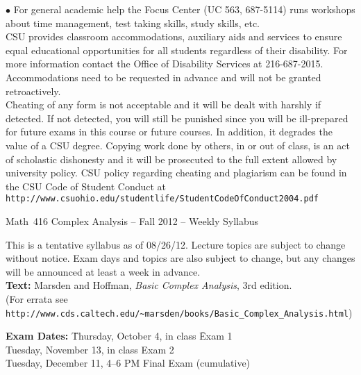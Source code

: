 \documentclass[11pt]{article}
\begin{document}
$\bullet$ For general academic help the Focus Center (UC 563,
687-5114) runs workshops about time management, test taking skills,
study skills, etc. \\

 CSU provides 
classroom accommodations, auxiliary aids and services to ensure equal educational
opportunities for all students regardless of their disability. For more information contact
the Office of Disability Services at 216-687-2015. Accommodations need to be
requested in advance and will not be granted retroactively.\\

 Cheating of any form is not
acceptable and it will be dealt with harshly if detected. If not
detected, you will still be punished since you will be ill-prepared
for future exams in this course or future courses. In addition, it
degrades the value of a CSU degree.
Copying work done by others, in or out of class, is an act of
scholastic dishonesty and it will be prosecuted to the full extent
allowed by university policy. 
CSU policy regarding cheating and plagiarism can be found in the CSU
Code of Student Conduct at
{\tt http://www.csuohio.edu/studentlife/StudentCodeOfConduct2004.pdf}

\newpage
\setlength{\topmargin}{0in}
\setlength{\oddsidemargin}{0in}
\setlength{\textwidth}{6.5in}
\setlength{\textheight}{9.2in}
\setlength{\parindent}{0in}
\pagestyle{empty}

\begin{center}
\begin{bf}
\noindent
{\large Math~416 Complex Analysis -- Fall 2012 -- Weekly Syllabus}\\
\end{bf}
\end{center}

This is a tentative syllabus as of 08/26/12. Lecture topics are subject
to change without notice. Exam days and topics 
are also subject to change, but any changes will be
announced at least a week in advance.\\
  
{\bf Text:} Marsden and Hoffman, {\it
  Basic Complex Analysis}, 3rd edition.\\
(For errata see \verb|http://www.cds.caltech.edu/~marsden/books/Basic_Complex_Analysis.html|) 
 
\begin{tabbing}
{\bf Exam Dates: }
\= Thursday, October 4, in class \hspace{1in} \= Exam 1\\ 
\> Tuesday, November 13, in class  \> Exam 2\\
\> Tuesday, December 11, 4--6 PM \> Final Exam (cumulative)\\
\end{tabbing}
\end{document}

